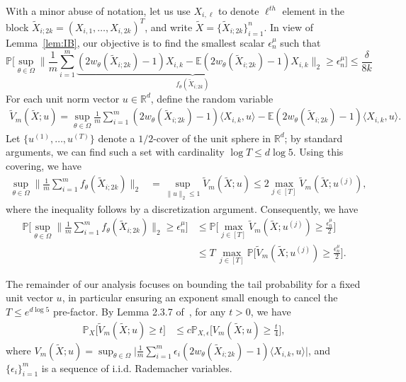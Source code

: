\documentclass[twoside,11pt]{article}
\newcommand{\numobs}{\ensuremath{n}}
\newcommand{\usedim}{\ensuremath{d}}
\def\EE{ \mathbb{E} }
\newcommand{\norm}[1]{\ensuremath{\|#1\|_2}}
\newcommand{\weightsingle}[2]{w_{#1}(#2)}
\newcommand{\epsilonobs}{\epsilon^\paramobs}
\newcommand{\paramobs}{\mu}
\newcommand{\paramjoint}{\theta}
\newcommand{\paramspacejoint}{\DomTheta}
\newcommand{\mprob}{\ensuremath{\mathbb{P}}}
\newcommand{\real}{\ensuremath{\mathbb{R}}}
\newcommand{\DomTheta}{\ensuremath{\Omega}}
\newcommand{\Xtil}{\ensuremath{\widetilde{X}}}
\newcommand{\processobs}{\ensuremath{\tilde{V}_m}}
\newcommand{\processradobs}{\ensuremath{V_m}}
\newcommand{\funcproc}{f_{\paramjoint}}
\newcommand{\blockXi}{\Xtil_{i;2k}}
\newcommand{\COVNUM}{\ensuremath{T}}
\begin{document}
With a minor abuse of notation, let us use $X_{i,\ell}$ to denote
$\ell^{th}$ element in the block $\Xtil_{i;2k} = (X_{i,1},\dots,
X_{i,2k})^T$, and write $\Xtil = \{\blockXi\}_{i=1}^n$.  In view of
Lemma~\ref{lem:IB}, our objective is to find the smallest scalar
$\epsilonobs_{\numobs}$ such that
\begin{equation}
\label{EqnUniform}
\mprob \big [\sup_{\paramjoint\in\paramspacejoint}\norm{\frac{1}{m}
    \sum_{i=1}^m \underbrace{(2
      \weightsingle{\paramjoint}{\Xtil_{i;2k}} -1)X_{i,k} - \EE (2
      \weightsingle{\paramjoint}{\Xtil_{i;2k}} -1)X_{i,k}}_{
      \funcproc(\blockXi)}} \geq \epsilonobs_\numobs \big] \leq
\frac{\delta}{8k}
\end{equation}
For each unit norm vector $u \in \real^\usedim$, define the random
variable 
\begin{align*}
\processobs(\Xtil;u) = \sup_{\paramjoint\in\paramspacejoint}
\frac{1}{m}\sum_{i=1}^m (2 \weightsingle{\paramjoint}{\Xtil_{i;2k}}
-1) \langle X_{i,k},u \rangle - \EE (2
\weightsingle{\paramjoint}{\Xtil_{i;2k}} -1)\langle X_{i,k}, u\rangle.
\end{align*}
Let $\{u^{(1)}, \ldots, u^{(\COVNUM)} \}$ denote a $1/2$-cover of the
unit sphere in $\real^\usedim$; by standard arguments, we can find
such a set with cardinality $\log \COVNUM \leq \usedim \log 5$.  Using
this covering, we have
\begin{align*}
\sup_{\paramjoint\in\paramspacejoint}\norm{\frac{1}{m} \sum_{i=1}^m
  \funcproc(\blockXi)} & = \sup_{\norm{u}\leq 1} \processobs(\Xtil; u)
\leq 2 \max_{j\in [\COVNUM]} \processobs(\Xtil ;u^{(j)}),
\end{align*}
where the inequality follows by a discretization argument.  
Consequently, we have
\begin{align*}
\mprob \big[ \sup_{\paramjoint\in\paramspacejoint}\norm{\frac{1}{m}
    \sum_{i=1}^m \funcproc(\blockXi)} \geq \epsilonobs_\numobs \big] &
\leq \mprob \big[ \max_{j \in [\COVNUM]} \processobs(\Xtil;u^{(j)})
  \geq \frac{\epsilonobs_\numobs}{2} \big] \\
%
& \leq \COVNUM \, \max_{j \in [\COVNUM]} \mprob \big[
  \processobs(\Xtil;u^{(j)}) \geq \frac{\epsilonobs_\numobs}{2} \big].
\end{align*} 

The remainder of our analysis focuses on bounding the tail probability
for a fixed unit vector $u$, in particular ensuring an exponent small
enough to cancel the $\COVNUM \leq e^{\usedim \log 5}$ pre-factor.  By
Lemma 2.3.7 of~\cite{vdVWell}, for any $t >
0$, we have
\begin{align*}
\mprob_X \big[\processobs(\Xtil; u) \geq t \big] & \leq c
\mprob_{X,\epsilon} \big[ \processradobs(\Xtil; u) \geq \frac{t}{4}
  \big],
\end{align*}
where $\processradobs(\Xtil;u) = \sup_{\paramjoint\in\paramspacejoint}
\big| \frac{1}{m}\sum_{i=1}^m \epsilon_i (2
\weightsingle{\paramjoint}{\Xtil_{i;2k}} -1) \langle X_{i,k},u \rangle
\big|$, and $\{\epsilon_i\}_{i=1}^m$ is a sequence of
i.i.d. Rademacher variables.
\end{document}
